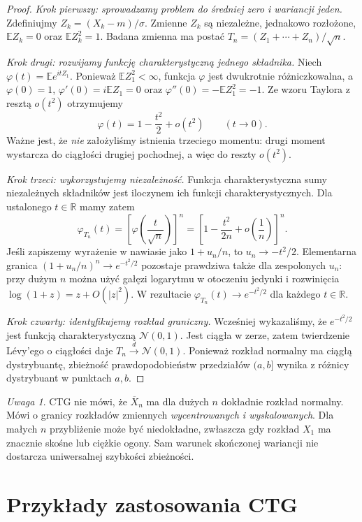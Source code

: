 \documentclass[11pt,a4paper,oneside]{report}
\numberwithin{equation}{chapter}
\theoremstyle{plain}
\theoremstyle{definition}
\theoremstyle{remark}
\newtheorem{uwaga}{Uwaga}[chapter]
\newcommand{\R}{\mathbb{R}}
\newcommand{\E}{\mathbb{E}}
\newcommand{\Normal}{\mathcal{N}}
\begin{document}
\begin{proof}
\emph{Krok pierwszy: sprowadzamy problem do średniej
zero i wariancji jeden.}
Zdefiniujmy $Z_k=(X_k-m)/\sigma$.
Zmienne $Z_k$ są niezależne, jednakowo rozłożone,
$\E Z_k=0$ oraz $\E Z_k^2=1$.
Badana zmienna ma postać
$T_n=(Z_1+\cdots+Z_n)/\sqrt n$.

\emph{Krok drugi: rozwijamy funkcję charakterystyczną
jednego składnika.} Niech $\varphi(t)=\E e^{itZ_1}$.
Ponieważ $\E Z_1^2<\infty$, funkcja $\varphi$ jest
dwukrotnie różniczkowalna, a
$\varphi(0)=1$, $\varphi'(0)=i\E Z_1=0$ oraz
$\varphi''(0)=-\E Z_1^2=-1$.
Ze wzoru Taylora z resztą $o(t^2)$ otrzymujemy
\[
\varphi(t)=1-\frac{t^2}{2}+o(t^2)
\qquad(t\to0).
\]
Ważne jest, że \emph{nie} założyliśmy istnienia
trzeciego momentu: drugi moment wystarcza do
ciągłości drugiej pochodnej, a więc do reszty $o(t^2)$.

\emph{Krok trzeci: wykorzystujemy niezależność.}
Funkcja charakterystyczna sumy niezależnych składników
jest iloczynem ich funkcji charakterystycznych.
Dla ustalonego $t\in\R$ mamy zatem
\[
\varphi_{T_n}(t)
=\left[\varphi\!\left(\frac{t}{\sqrt n}\right)\right]^n
=\left[1-\frac{t^2}{2n}+o\!\left(\frac1n\right)\right]^n.
\]
Jeśli zapiszemy wyrażenie w nawiasie jako
$1+u_n/n$, to $u_n\to-t^2/2$.
Elementarna granica $(1+u_n/n)^n\to e^{-t^2/2}$
pozostaje prawdziwa także dla zespolonych $u_n$:
przy dużym $n$ można użyć gałęzi logarytmu w
otoczeniu jedynki i rozwinięcia
$\log(1+z)=z+O(|z|^2)$.
W rezultacie
$\varphi_{T_n}(t)\to e^{-t^2/2}$ dla każdego $t\in\R$.

\emph{Krok czwarty: identyfikujemy rozkład graniczny.}
Wcześniej wykazaliśmy, że $e^{-t^2/2}$ jest
funkcją charakterystyczną $\Normal(0,1)$.
Jest ciągła w zerze, zatem twierdzenie Lévy'ego o
ciągłości daje $T_n\xrightarrow d\Normal(0,1)$.
Ponieważ rozkład normalny ma ciągłą dystrybuantę,
zbieżność prawdopodobieństw przedziałów $(a,b]$
wynika z różnicy dystrybuant w punktach $a,b$.
\end{proof}

\begin{uwaga}
CTG nie mówi, że $\overline X_n$ ma dla dużych $n$
dokładnie rozkład normalny. Mówi o granicy rozkładów
zmiennych \emph{wycentrowanych i wyskalowanych}.
Dla małych $n$ przybliżenie może być niedokładne,
zwłaszcza gdy rozkład $X_1$ ma znacznie skośne
lub ciężkie ogony. Sam warunek skończonej wariancji
nie dostarcza uniwersalnej szybkości zbieżności.
\end{uwaga}

\section{Przykłady zastosowania CTG}
\end{document}
